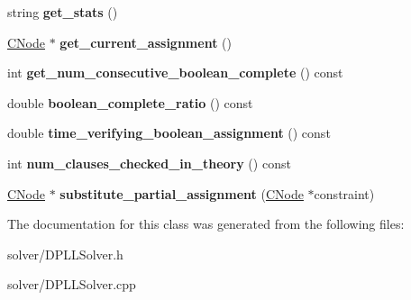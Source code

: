 \begin{DoxyCompactItemize}
\item 
\hypertarget{classDPLLSolver_ab508b0a082d20e89ab49a0cdaa2479b6}{string {\bfseries get\-\_\-stats} ()}\label{classDPLLSolver_ab508b0a082d20e89ab49a0cdaa2479b6}

\item 
\hypertarget{classDPLLSolver_a3879075c66f882bd03d5950a39f8fa95}{\hyperlink{classCNode}{\-C\-Node} $\ast$ {\bfseries get\-\_\-current\-\_\-assignment} ()}\label{classDPLLSolver_a3879075c66f882bd03d5950a39f8fa95}

\item 
\hypertarget{classDPLLSolver_a506016ab888db5b911db88de4ba88fc2}{int {\bfseries get\-\_\-num\-\_\-consecutive\-\_\-boolean\-\_\-complete} () const }\label{classDPLLSolver_a506016ab888db5b911db88de4ba88fc2}

\item 
\hypertarget{classDPLLSolver_a9fcdffbba56b43867aa7c0df93b08bac}{double {\bfseries boolean\-\_\-complete\-\_\-ratio} () const }\label{classDPLLSolver_a9fcdffbba56b43867aa7c0df93b08bac}

\item 
\hypertarget{classDPLLSolver_aa1dcbd6358c3ceddff66a1c90e8bfed8}{double {\bfseries time\-\_\-verifying\-\_\-boolean\-\_\-assignment} () const }\label{classDPLLSolver_aa1dcbd6358c3ceddff66a1c90e8bfed8}

\item 
\hypertarget{classDPLLSolver_a0fd2424e651b2b8679f8ce4e12dd38f3}{int {\bfseries num\-\_\-clauses\-\_\-checked\-\_\-in\-\_\-theory} () const }\label{classDPLLSolver_a0fd2424e651b2b8679f8ce4e12dd38f3}

\item 
\hypertarget{classDPLLSolver_a54a36e043d82076fc80834e3fbeb470a}{\hyperlink{classCNode}{\-C\-Node} $\ast$ {\bfseries substitute\-\_\-partial\-\_\-assignment} (\hyperlink{classCNode}{\-C\-Node} $\ast$constraint)}\label{classDPLLSolver_a54a36e043d82076fc80834e3fbeb470a}

\end{DoxyCompactItemize}


\-The documentation for this class was generated from the following files\-:\begin{DoxyCompactItemize}
\item 
solver/\-D\-P\-L\-L\-Solver.\-h\item 
solver/\-D\-P\-L\-L\-Solver.\-cpp\end{DoxyCompactItemize}
